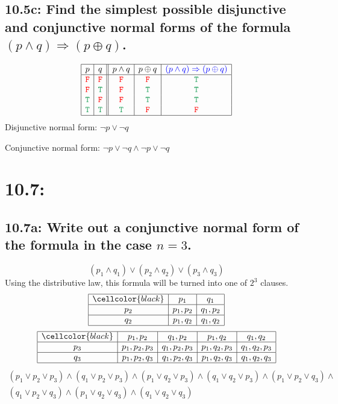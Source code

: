 \documentclass{article}
\begin{document}
\subsection*{10.5c: Find the simplest possible disjunctive and conjunctive normal forms of the formula $(p\land q)\Rightarrow(p\oplus q)$.}
\[\begin{array}{|c|c||c|c|c|}
\hline
p&q&p\land q&p\oplus q&\textcolor{blue}{(p\land q)\Rightarrow(p\oplus q)}\\
\hline
\textcolor{red}{\tt{F}}&\textcolor{red}{\tt{F}}&\textcolor{red}{\tt{F}}&\textcolor{red}{\tt{F}}&\textcolor{ForestGreen}{\tt{T}}\\
\textcolor{red}{\tt{F}}&\textcolor{ForestGreen}{\tt{T}}&\textcolor{red}{\tt{F}}&\textcolor{ForestGreen}{\tt{T}}&\textcolor{ForestGreen}{\tt{T}}\\
\textcolor{ForestGreen}{\tt{T}}&\textcolor{red}{\tt{F}}&\textcolor{red}{\tt{F}}&\textcolor{ForestGreen}{\tt{T}}&\textcolor{ForestGreen}{\tt{T}}\\
\textcolor{ForestGreen}{\tt{T}}&\textcolor{ForestGreen}{\tt{T}}&\textcolor{ForestGreen}{\tt{T}}&\textcolor{red}{\tt{F}}&\textcolor{red}{\tt{F}}\\
\hline
\end{array}\]
Disjunctive normal form: $\neg p\lor\neg q$

Conjunctive normal form: $\neg p\lor\neg q\land\neg p\lor\neg q$
\section*{10.7:}
\subsection*{10.7a: Write out a conjunctive normal form of the formula in the case $n=3$.}
\[(p_1\land q_1)\lor(p_2\land q_2)\lor(p_3\land q_3)\]
Using the distributive law, this formula will be turned into one of $2^3$ clauses.
\[\begin{array}{|c|c|c|}
\hline
\cellcolor{black}&p_1&q_1\\
\hline
p_2&p_1,p_2&q_1,p_2\\
\hline
q_2&p_1,q_2&q_1,q_2\\
\hline
\end{array}\]
\[\begin{array}{|c|c|c|c|c|}
\hline
\cellcolor{black}&p_1,p_2&q_1,p_2&p_1,q_2&q_1,q_2\\
\hline
p_3&p_1,p_2,p_3&q_1,p_2,p_3&p_1,q_2,p_3&q_1,q_2,p_3\\
\hline
q_3&p_1,p_2,q_3&q_1,p_2,q_3&p_1,q_2,q_3&q_1,q_2,q_3\\
\hline
\end{array}\]
\begin{gather*}
  (p_1\lor p_2\lor p_3)\land(q_1\lor p_2\lor p_3)\land(p_1\lor q_2\lor p_3)\land(q_1\lor q_2\lor p_3)\land(p_1\lor p_2\lor q_3)\land\\(q_1\lor p_2\lor q_3)\land(p_1\lor q_2\lor q_3)\land(q_1\lor q_2\lor q_3)
\end{gather*}
\end{document}
